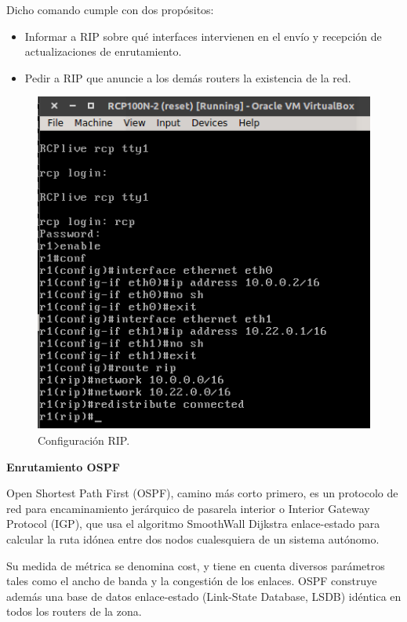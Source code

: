 Dicho comando cumple con dos propósitos:
\begin{itemize}
\item Informar a RIP sobre qué interfaces intervienen en el envío y recepción de actualizaciones de enrutamiento.
\item Pedir a RIP que anuncie a los demás routers la existencia de la red.
\end{itemize}
\FloatBarrier
\begin{figure}[htbp!]
		\centering
			\includegraphics[width=.45 \textwidth]{images/rip}
		\caption{Configuración RIP.}
		\label{image:rip}
\end{figure}
\FloatBarrier


\textbf{Enrutamiento OSPF}
\\ \par
Open Shortest Path First (OSPF), camino más corto primero, es un protocolo de red para encaminamiento jerárquico de pasarela interior o Interior Gateway Protocol (IGP), que usa el algoritmo SmoothWall Dijkstra enlace-estado para calcular la ruta idónea entre dos nodos cualesquiera de un sistema autónomo.

Su medida de métrica se denomina cost, y tiene en cuenta diversos parámetros tales como el ancho de banda y la congestión de los enlaces. OSPF construye además una base de datos enlace-estado (Link-State Database, LSDB) idéntica en todos los routers de la zona.

